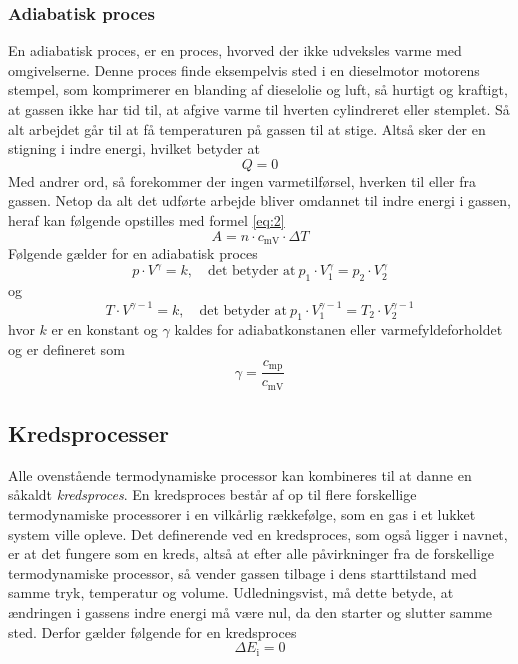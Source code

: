 \documentclass[12pt,a4paper]{article}
\begin{document}
			\subsubsection{Adiabatisk proces}
			En adiabatisk proces, er en proces, hvorved der ikke udveksles varme med 
			omgivelserne. Denne proces finde eksempelvis sted i en dieselmotor motorens 
			stempel, som komprimerer en blanding af dieselolie og luft, så hurtigt og kraftigt,
			at gassen ikke har tid til, at afgive varme til hverten cylindreret eller stemplet. Så alt arbejdet går til at få temperaturen på gassen til at stige. Altså sker der en stigning i indre energi, hvilket betyder at 
			\begin{equation}
				Q = 0
			\end{equation}
			Med andrer ord, så forekommer der ingen varmetilførsel, hverken til eller fra gassen. Netop da 
			alt det udførte arbejde bliver omdannet til indre energi i gassen, heraf kan
			følgende opstilles med formel \eqref{eq:2}
			\begin{equation}
				A = n \cdot c_{\text{mV}} \cdot \Delta T 
			\end{equation}
			Følgende gælder for en adiabatisk proces
			\begin{equation}
				p \cdot V^\gamma = k,\quad \text{det betyder at}\ p_1 \cdot V_1^\gamma= p_2 \cdot V_2^\gamma
			\end{equation}
			og 
			\begin{equation}
				T \cdot V^{\gamma-1} = k,\quad \text{det betyder at}\ p_1 \cdot V_1^{\gamma-1}= T_2 \cdot V_2^{\gamma-1}
			\end{equation}
			hvor \(k\) er en konstant og \(\gamma\) kaldes
			for adiabatkonstanen eller varmefyldeforholdet og er defineret som
			\begin{equation}
				\gamma = \frac{c_{\textrm{mp}}}{c_{\textrm{mV}}}
			\end{equation}
			\subsection{Kredsprocesser}
			Alle ovenstående termodynamiske processor kan kombineres til at danne
			en såkaldt \textit{kredsproces}. En kredsproces består af op til flere 
			forskellige termodynamiske processorer i en vilkårlig rækkefølge, som en gas i 
			et lukket system ville opleve. Det definerende ved en kredsproces, som også 
			ligger i navnet, er at det fungere som en kreds, altså at efter alle påvirkninger
			fra de forskellige termodynamiske processor, så vender gassen tilbage i dens starttilstand med
			samme tryk, temperatur og volume. Udledningsvist, må dette betyde, at ændringen 
			i gassens indre energi må være nul, da den starter og slutter samme sted. Derfor gælder følgende for en kredsproces
			\begin{equation}
				\Delta E_\text{i} = 0
			\end{equation} 
\end{document}
